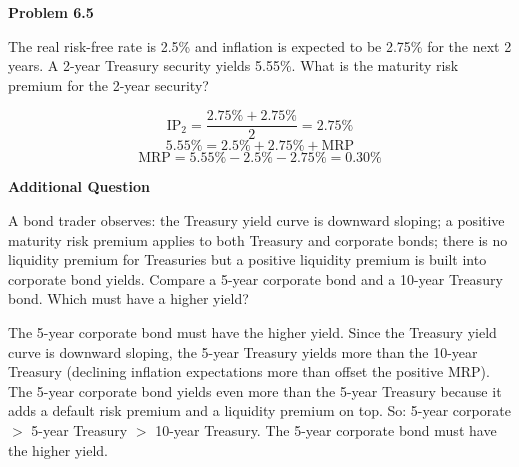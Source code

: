 \documentclass[11pt]{article}
\begin{document}
\bigskip\bigskip

\textbf{Problem 6.5}
\bigskip

The real risk-free rate is 2.5\% and inflation is expected to be 2.75\% for the next 2 years. A 2-year Treasury security yields 5.55\%. What is the maturity risk premium for the 2-year security?

\bigskip
\bigskip

\[
\text{IP}_2 = \frac{2.75\% + 2.75\%}{2} = 2.75\%
\]
\[
5.55\% = 2.5\% + 2.75\% + \text{MRP}
\]
\[
\text{MRP} = 5.55\% - 2.5\% - 2.75\% = \boxed{0.30\%}
\]

\bigskip\bigskip

\textbf{Additional Question}
\bigskip

A bond trader observes: the Treasury yield curve is downward sloping; a positive maturity risk premium applies to both Treasury and corporate bonds; there is no liquidity premium for Treasuries but a positive liquidity premium is built into corporate bond yields. Compare a 5-year corporate bond and a 10-year Treasury bond. Which must have a higher yield?

\bigskip
\bigskip

The 5-year corporate bond must have the higher yield. Since the Treasury yield curve is downward sloping, the 5-year Treasury yields more than the 10-year Treasury (declining inflation expectations more than offset the positive MRP). The 5-year corporate bond yields even more than the 5-year Treasury because it adds a default risk premium and a liquidity premium on top. So: 5-year corporate $>$ 5-year Treasury $>$ 10-year Treasury. The 5-year corporate bond must have the higher yield.
\end{document}

